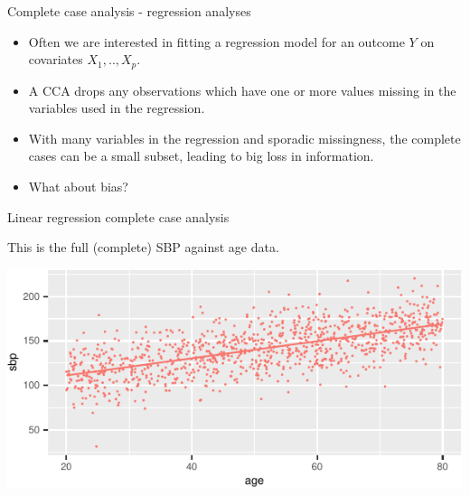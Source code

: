 \documentclass[ignorenonframetext,]{beamer}
\providecommand{\tightlist}{%
  \setlength{\itemsep}{0pt}\setlength{\parskip}{0pt}}
\begin{document}
\begin{frame}{Complete case analysis - regression analyses}
\protect\hypertarget{complete-case-analysis---regression-analyses}{}

\begin{itemize}
\tightlist
\item
  Often we are interested in fitting a regression model for an outcome
  \(Y\) on covariates \(X_{1},..,X_{p}\).
\item
  A CCA drops any observations which have one or more values missing in
  the variables used in the regression.
\item
  With many variables in the regression and sporadic missingness, the
  complete cases can be a small subset, leading to big loss in
  information.
\item
  What about bias?
\end{itemize}

\end{frame}

\begin{frame}{Linear regression complete case analysis}
\protect\hypertarget{linear-regression-complete-case-analysis}{}

This is the full (complete) SBP against age data.

\begin{center}\includegraphics{Lecture2_files/figure-beamer/unnamed-chunk-9-1} \end{center}

\end{frame}
\end{document}
